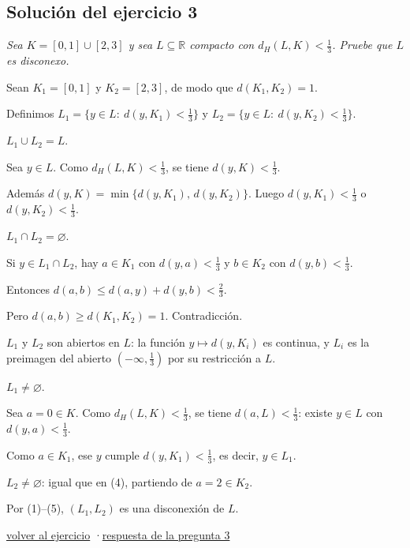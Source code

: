\documentclass[11pt,a4paper]{article}
\newcommand{\R}{\mathbb{R}}\newcommand{\N}{\mathbb{N}}\newcommand{\Q}{\mathbb{Q}}
\providecommand{\lt}{<}\providecommand{\gt}{>}
\begin{document}
\subsection*{\hypertarget{s-3}{}Solución del ejercicio 3}
\emph{Sea $K=[0,1]\cup[2,3]$ y sea $L\subseteq\R$ compacto con $d_H(L,K)\lt \frac13$. Pruebe que $L$ es disconexo.}
\begin{pasos}
\item[] Sean $K_1=[0,1]$ y $K_2=[2,3]$, de modo que $d(K_1,K_2)=1$.
\item[] Definimos $L_1=\{y\in L:\ d(y,K_1)\lt \frac13\}$ y $L_2=\{y\in L:\ d(y,K_2)\lt \frac13\}$.
\item[(1)] $L_1\cup L_2=L$.
\begin{subpasos}
\item Sea $y\in L$. Como $d_H(L,K)\lt \frac13$, se tiene $d(y,K)\lt \frac13$.
\item Además $d(y,K)=\min\{d(y,K_1),\,d(y,K_2)\}$. Luego $d(y,K_1)\lt \frac13$ o $d(y,K_2)\lt \frac13$.
\end{subpasos}
\item[(2)] $L_1\cap L_2=\varnothing$.
\begin{subpasos}
\item Si $y\in L_1\cap L_2$, hay $a\in K_1$ con $d(y,a)\lt \frac13$ y $b\in K_2$ con $d(y,b)\lt \frac13$.
\item Entonces $d(a,b)\le d(a,y)+d(y,b)\lt \frac23$.
\item Pero $d(a,b)\ge d(K_1,K_2)=1$. Contradicción.
\end{subpasos}
\item[(3)] $L_1$ y $L_2$ son abiertos en $L$: la función $y\mapsto d(y,K_i)$ es continua, y $L_i$ es la preimagen del abierto $(-\infty,\frac13)$ por su restricción a $L$.
\item[(4)] $L_1\ne\varnothing$.
\begin{subpasos}
\item Sea $a=0\in K$. Como $d_H(L,K)\lt \frac13$, se tiene $d(a,L)\lt \frac13$: existe $y\in L$ con $d(y,a)\lt \frac13$.
\item Como $a\in K_1$, ese $y$ cumple $d(y,K_1)\lt \frac13$, es decir, $y\in L_1$.
\end{subpasos}
\item[(5)] $L_2\ne\varnothing$: igual que en (4), partiendo de $a=2\in K_2$.
\item[] Por (1)–(5), $(L_1,L_2)$ es una disconexión de $L$.
\end{pasos}
\par{\small \hyperlink{x-3}{volver al ejercicio} \quad·\quad \hyperlink{r-3}{respuesta de la pregunta 3}}
\end{document}
